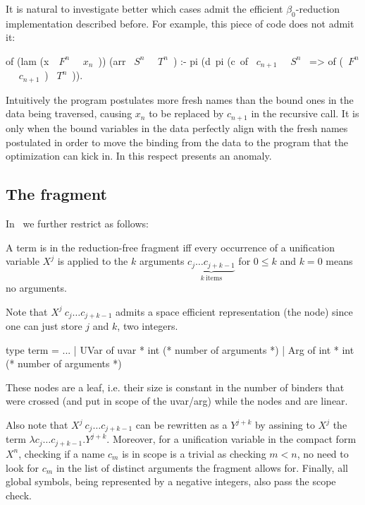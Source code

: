 \documentclass[a4paper, 11pt]{book}
\begin{document}
It is natural to investigate better which cases admit the efficient $\beta_0$-reduction
implementation described before. For example, this piece of code does not
admit it:

\begin{elpicode}
of (lam (x\ ~$F^n$~ ~$x_n$~)) (arr ~$S^n$~ ~$T^n$~) :-
  pi (d\ pi (c\ of ~$c_{n+1}$~ ~$S^n$~ => of (~$F^n$~ ~$c_{n+1}$~) ~$T^n$~)).
\end{elpicode}

\noindent
Intuitively the program postulates more fresh names than the bound ones
in the data being traversed, causing $x_n$ to be replaced by $c_{n+1}$
in the recursive call.
It is only when the bound variables in the data perfectly align with the fresh
names postulated in order to move the binding from the data to the program that
the optimization can kick in. In this respect 
presents an anomaly.

\subsection{The \thefragment fragment}\label{sec:llambo}

In~\cite{dunchev15lpar} we further restrict \theotherfragment as follows:

\begin{definition}
A term is in the reduction-free fragment \thefragment
iff every occurrence of a unification variable $X^j$
is applied to the $k$ arguments $\underbrace{c_j \ldots c_{j + k-1}}_{k~\mathrm{items}}$
for $0 \leq k$ and $k=0$ means no arguments.
\end{definition}

Note that $X^j\ c_j \ldots c_{j + k-1}$ admits a space efficient
representation (the  node) since one can just
store $j$ and $k$, two integers.

\begin{ocamlcode}
type term =
  ...
  | UVar of uvar * int (* number of arguments *)
  | Arg  of int  * int (* number of arguments *)
\end{ocamlcode}

\noindent
These nodes are a leaf, i.e. their size is constant in the
number of binders that were crossed (and put in scope of the uvar/arg)
while the nodes  and  are linear.

Also note that $X^j\ c_j \ldots c_{j + k-1}$ can be rewritten
as a $Y^{j+k}$ by assining to $X^j$ the term $\lambda c_j \ldots c_{j + k-1}. Y^{j+k}$.
Moreover, for a unification variable in the compact form $X^n$,
checking if a name $c_m$ is in scope is a trivial as checking
$m < n$, no need to look for $c_m$ in the list of distinct arguments
the \theotherfragment fragment allows for. Finally, all global symbols, being
represented by a negative integers, also pass the scope check.
\end{document}
